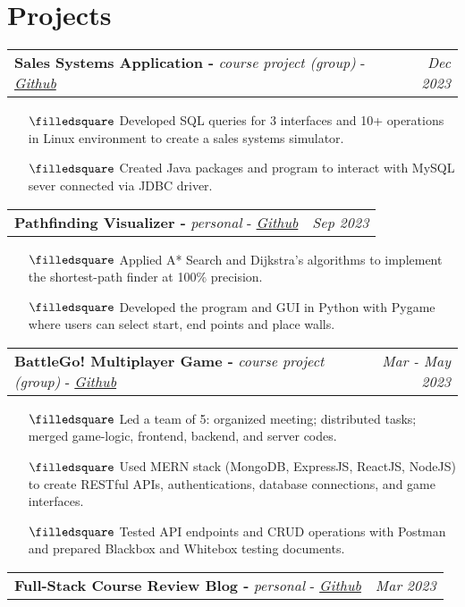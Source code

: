 \documentclass[letterpaper,10.8pt]{article}
\makeatletter
\newcommand{\headerrow}[4]{%
  \vspace{#4}
  \begin{tabular*}{\dimexpr\linewidth}{@{\extracolsep{\fill}}lr@{}}
    \hspace{#1}\hspace{0.1cm} #2 &
    #3 \\
  \end{tabular*}%
}
\makeatother
\begin{document}
\section{\textbf{Projects}}
\headerrow{0mm}{\textbf{Sales Systems Application - } \textit{course project (group)} - \href{https://github.com/pearlpisut/csci3170-SalesSystem}{ \textit{Github}}}{\textit{Dec 2023}}{0mm}
\vspace{-5.5mm}
\begin{itemize}[leftmargin=7mm]
  \itemsep-0.7mm
  \item[$\filledsquare$] Developed SQL queries for 3 interfaces and 10+ operations in Linux environment to create a sales systems simulator.
  \item[$\filledsquare$] Created Java packages and program to interact with MySQL sever connected via JDBC driver. 
\end{itemize}
\headerrow{0mm}{\textbf{Pathfinding Visualizer - } \textit{personal} - \href{https://github.com/pearlpisut/pathfinding-visualizer}{\textit{Github}}}{\textit{Sep 2023}}{0mm}
\vspace{-5.5mm}
\begin{itemize}[leftmargin=7mm]
  \itemsep-0.7mm
  \item[$\filledsquare$] Applied A* Search and Dijkstra's algorithms to implement the shortest-path finder at 100$\%$ precision.
  \item[$\filledsquare$] Developed the program and GUI in Python with Pygame where users can select start, end points and place walls.
\end{itemize}
\headerrow{0mm}{\textbf{BattleGo! Multiplayer Game - } \textit{course project (group)} - \href{https://github.com/pearlpisut/CSCI3100-Project-E2}{ \textit{Github}}}{\textit{Mar - May 2023}}{0mm}
\vspace{-5.5mm}
\begin{itemize}[leftmargin=7mm]
  \itemsep-0.7mm
  \item[$\filledsquare$] Led a team of 5: organized meeting; distributed tasks; merged game-logic, frontend, backend, and server codes.
  \item[$\filledsquare$] Used MERN stack (MongoDB, ExpressJS, ReactJS, NodeJS) to create RESTful APIs, authentications, database connections, and game interfaces.
  \item[$\filledsquare$] Tested API endpoints and CRUD operations with Postman and prepared Blackbox and Whitebox testing documents.
\end{itemize}
\headerrow{0mm}{\textbf{Full-Stack Course Review Blog - }  \textit{personal} - \href{https://github.com/pearlpisut/full-stack-blog-app}{ \textit{Github}}}{\textit{Mar 2023}}{0mm}
\end{document}
